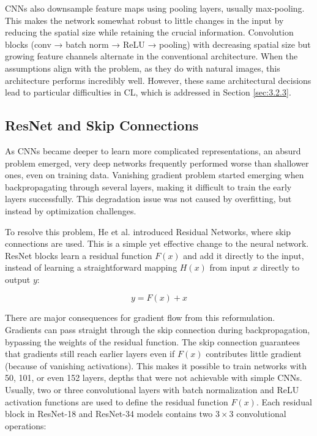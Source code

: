 \documentclass[english, LaM, oneside]{sapthesis}%
\numberwithin{equation}{chapter}
\begin{document}
CNNs also downsample feature maps using pooling layers, usually max-pooling. This makes the network somewhat robust to little changes in the input by reducing the spatial size while retaining the crucial information. Convolution blocks (conv → batch norm → ReLU → pooling) with decreasing spatial size but growing feature channels alternate in the conventional architecture\cite{24}.
When the assumptions align with the problem, as they do with natural images, this architecture performs incredibly well. However, these same architectural decisions lead to particular difficulties in CL, which is addressed in Section \ref{sec:3.2.3}.

\subsection{ResNet and Skip Connections}
As CNNs became deeper to learn more complicated representations, an absurd problem emerged, very deep networks frequently performed worse than shallower ones, even on training data. Vanishing gradient problem started emerging when backpropagating through several layers, making it difficult to train the early layers successfully\cite{25}. This degradation issue was not caused by overfitting, but instead by optimization challenges.

To resolve this problem, He et al.\cite{3} introduced Residual Networks, where skip connections are used. This is a simple yet effective change to the neural network. ResNet blocks learn a residual function $F(x)$ and add it directly to the input, instead of learning a straightforward mapping $H(x)$ from input $x$ directly to output $y$:

\begin{equation}
    y = F(x) + x
\end{equation}

There are major consequences for gradient flow from this reformulation. Gradients can pass straight through the skip connection during backpropagation, bypassing the weights of the residual function. The skip connection guarantees that gradients still reach earlier layers even if $F(x)$ contributes little gradient (because of vanishing activations). This makes it possible to train networks with 50, 101, or even 152 layers, depths that were not achievable with simple CNNs.
Usually, two or three convolutional layers with batch normalization and ReLU activation functions are used to define the residual function $F(x)$. Each residual block in ResNet-18 and ResNet-34 models contains two $3\times3$ convolutional operations:
\end{document}
